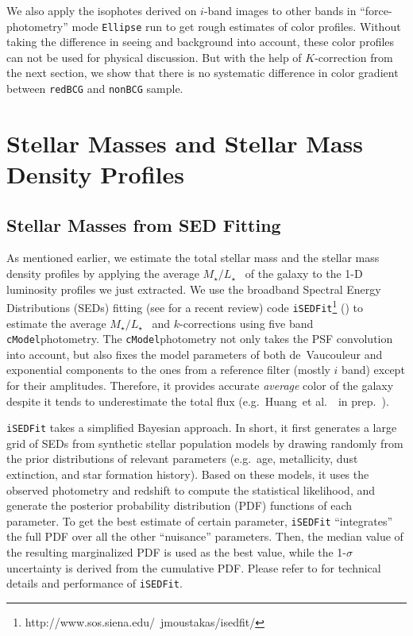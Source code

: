 \documentclass[preprint]{aastex}
\def\etal{{\ et al.~}}
\def\cmodel{\texttt{cModel}}
\def\m2l{{$M_{\star}/L_{\star}$}~}
\begin{document}
\begin{CJK*}{UTF8}{gbsn}
    We also apply the isophotes derived on $i$-band images to other bands in 
    ``force-photometry'' mode \texttt{Ellipse} run to get rough estimates of 
    color profiles.  
    Without taking the difference in seeing and background into account, 
    these color profiles can not be used for physical discussion. 
    But with the help of $K$-correction from the next section, we show that there 
    is no systematic difference in color gradient between \texttt{redBCG} and 
    \texttt{nonBCG} sample. 
    
                
\section{Stellar Masses and Stellar Mass Density Profiles}
    
\subsection{Stellar Masses from SED Fitting}

    As mentioned earlier, we estimate the total stellar mass and the stellar mass 
    density profiles by applying the average \m2l of the galaxy to the 1-D luminosity 
    profiles we just extracted. 
    We use the broadband Spectral Energy Distributions (SEDs) fitting 
    (see \citealt{Walcher2011} for a recent review) code 
    \texttt{iSEDFit}\footnote{http://www.sos.siena.edu/~jmoustakas/isedfit/} 
    (\citealt{Moustakas2013}) to estimate the average \m2l and $k$-corrections using
    five band \cmodel photometry. 
    The \cmodel photometry not only takes the PSF convolution into account, but 
    also fixes the model parameters of both de~Vaucouleur and exponential components 
    to the ones from a reference filter (mostly $i$ band) except for their amplitudes.
    Therefore, it provides accurate \emph{average} color of the galaxy despite it tends 
    to underestimate the total flux (e.g.\ Huang\etal~in prep.~). 

    \texttt{iSEDFit} takes a simplified Bayesian approach. 
    In short, it first generates a large grid of SEDs from synthetic stellar 
    population models by drawing randomly from the prior distributions of relevant 
    parameters (e.g.\ age, metallicity, dust extinction, and star formation history).
    Based on these models, it uses the observed photometry and redshift to 
    compute the statistical likelihood, and generate the posterior probability 
    distribution (PDF) functions of each parameter.  
    To get the best estimate of certain parameter, \texttt{iSEDFit} ``integrates'' 
    the full PDF over all the other ``nuisance'' parameters.
    Then, the median value of the resulting marginalized PDF is used as the best
    value, while the 1-$\sigma$ uncertainty is derived from the cumulative PDF.
    Please refer to \citet{Moustakas2013} for technical details and performance of     
    \texttt{iSEDFit}. 
    

\end{CJK*}
\end{document}
